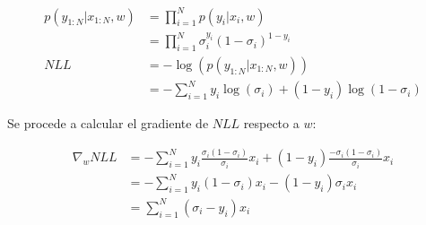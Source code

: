 \begin{align}
p(y_{1:N}|x_{1:N},w) &= \prod_{i=1}^{N}p(y_i|x_i,w)\\
&= \prod_{i=1}^{N}\sigma_i^{y_i}(1-\sigma_i)^{1-y_i}\\
NLL &= -\log(p(y_{1:N}|x_{1:N},w))\\
&= -\sum_{i=1}^N y_i\log(\sigma_i) + (1-y_i)\log(1-\sigma_i)
\end{align}

Se procede a calcular el gradiente de $NLL$ respecto a $w$:

\begin{align}
\nabla_w NLL &= -\sum_{i=1}^N y_i\frac{\sigma_i(1-\sigma_i)}{\sigma_i}x_i
+ (1-y_i)\frac{-\sigma_i(1-\sigma_i)}{\sigma_i}x_i\\
&= -\sum_{i=1}^N y_i(1-\sigma_i)x_i - (1-y_i)\sigma_ix_i\\
&= \sum_{i=1}^N (\sigma_i-y_i)x_i
\end{align}











